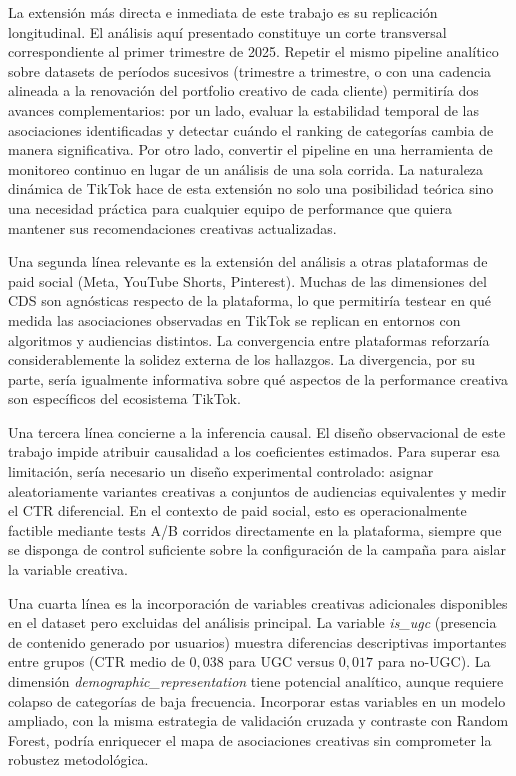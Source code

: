 \documentclass[12pt, a4paper]{report}
\begin{document}
La extensión más directa e inmediata de este trabajo es su replicación longitudinal. El
análisis aquí presentado constituye un corte transversal correspondiente al primer
trimestre de 2025. Repetir el mismo pipeline analítico sobre datasets de períodos
sucesivos (trimestre a trimestre, o con una cadencia alineada a la renovación del
portfolio creativo de cada cliente) permitiría dos avances complementarios: por un lado,
evaluar la estabilidad temporal de las asociaciones identificadas y detectar cuándo el
ranking de categorías cambia de manera significativa. Por otro lado, convertir el pipeline en
una herramienta de monitoreo continuo en lugar de un análisis de una sola corrida. La
naturaleza dinámica de TikTok hace de esta extensión no solo una posibilidad teórica
sino una necesidad práctica para cualquier equipo de performance que quiera mantener
sus recomendaciones creativas actualizadas.

Una segunda línea relevante es la extensión del análisis a otras plataformas de paid
social (Meta, YouTube Shorts, Pinterest). Muchas de las dimensiones del CDS son
agnósticas respecto de la plataforma, lo que permitiría testear en qué medida las
asociaciones observadas en TikTok se replican en entornos con algoritmos y audiencias
distintos. La convergencia entre plataformas reforzaría considerablemente la solidez
externa de los hallazgos. La divergencia, por su parte, sería igualmente informativa sobre
qué aspectos de la performance creativa son específicos del ecosistema TikTok.

Una tercera línea concierne a la inferencia causal. El diseño observacional de este trabajo
impide atribuir causalidad a los coeficientes estimados. Para superar esa limitación, sería
necesario un diseño experimental controlado: asignar aleatoriamente variantes creativas a
conjuntos de audiencias equivalentes y medir el CTR diferencial. En el contexto de paid
social, esto es operacionalmente factible mediante tests A/B corridos directamente en la
plataforma, siempre que se disponga de control suficiente sobre la configuración de la
campaña para aislar la variable creativa.

Una cuarta línea es la incorporación de variables creativas adicionales disponibles en el
dataset pero excluidas del análisis principal. La variable \textit{is\_ugc} (presencia de
contenido generado por usuarios) muestra diferencias descriptivas importantes entre
grupos (CTR medio de $0{,}038$ para UGC versus $0{,}017$ para no-UGC). La dimensión
\textit{demographic\_representation} tiene potencial analítico, aunque requiere colapso de
categorías de baja frecuencia. Incorporar estas variables en un modelo ampliado, con la
misma estrategia de validación cruzada y contraste con Random Forest, podría enriquecer
el mapa de asociaciones creativas sin comprometer la robustez metodológica.
\end{document}
